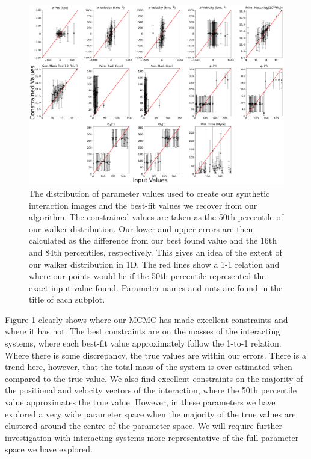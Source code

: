 \begin{figure}
\centering
\includegraphics[width=\textwidth]{Chapter1/figures/51_51.pdf}
\caption[The distribution of parameter values used to create our synthetic interaction images and the best-fit values we recover from our algorithm.]{The distribution of parameter values used to create our synthetic interaction images and the best-fit values we recover from our algorithm. The constrained values are taken as the 50th percentile of our walker distribution. Our lower and upper errors are then calculated as the difference from our best found value and the 16th and 84th percentiles, respectively. This gives an idea of the extent of our walker distribution in 1D. The red lines show a 1-1 relation and where our points would lie if the 50th percentile represented the exact input value found. Parameter names and unts are found in the title of each subplot.}
\label{fig:true-found-parameters}
\end{figure}

Figure \ref{fig:true-found-parameters} clearly shows where our MCMC has made excellent constraints and where it has not. The best constraints are on the masses of the interacting systems, where each best-fit value approximately follow the 1-to-1 relation. Where there is some discrepancy, the true values are within our errors. There is a trend here, however, that the total mass of the system is over estimated when compared to the true value. We also find excellent constraints on the majority of the positional and velocity vectors of the interaction, where the 50th percentile value approximates the true value. However, in these parameters we have explored a very wide parameter space when the majority of the true values are clustered around the centre of the parameter space. We will require further investigation with interacting systems more representative of the full parameter space we have explored. 

